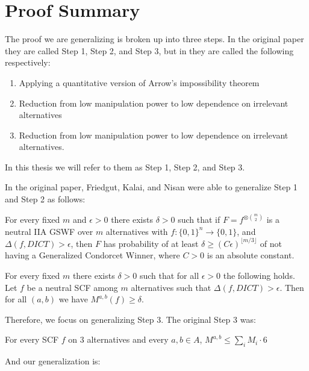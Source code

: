\section {Proof Summary}

	The proof we are generalizing is broken up into three steps. In the original paper they are called Step 1, Step 2, and Step 3, but in \cite{friedgut2011quantitative} they are called the following respectively:
	\begin{enumerate}
		\item Applying a quantitative version of Arrow's impossibility theorem
		\item Reduction from low manipulation power to low dependence on irrelevant alternatives
		\item Reduction from low manipulation power to low dependence on irrelevant alternatives.
	\end{enumerate}
	In this thesis we will refer to them as Step 1, Step 2, and Step 3.

	In the original paper, Friedgut, Kalai, and Nisan were able to generalize Step 1 and Step 2 as follows:

	\begin{lemma}
		For every fixed $m$ and $\epsilon > 0$ there exists $\delta > 0$ such that if $F = f^{\otimes \binom{m}{2}}$ is a neutral IIA GSWF over $m$ alternatives with $f : \{0,1\}^n \rightarrow \{0,1\}$, and $\Delta(f, DICT) > \epsilon$, then $F$ has probability of at least $\delta \ge (C\epsilon)^{\lfloor m/3 \rfloor}$ of not having a Generalized Condorcet Winner, where $C > 0$ is an absolute constant.
	\end{lemma}

	\begin{lemma}
		For every fixed $m$ there exists $\delta > 0$ such that for all $\epsilon > 0$ the following holds. Let $f$ be a neutral SCF among $m$ alternatives such that $\Delta(f, DICT) > \epsilon$. Then for all $(a,b)$ we have $M^{a,b}(f) \ge \delta$.
	\end{lemma}

	Therefore, we focus on generalizing Step 3. The original Step 3 was:

	\begin{lemma}
		For every SCF $f$ on $3$ alternatives and every $a,b \in A$, $M^{a,b} \le \sum_i M_i \cdot 6$
	\end{lemma}

	And our generalization is:

